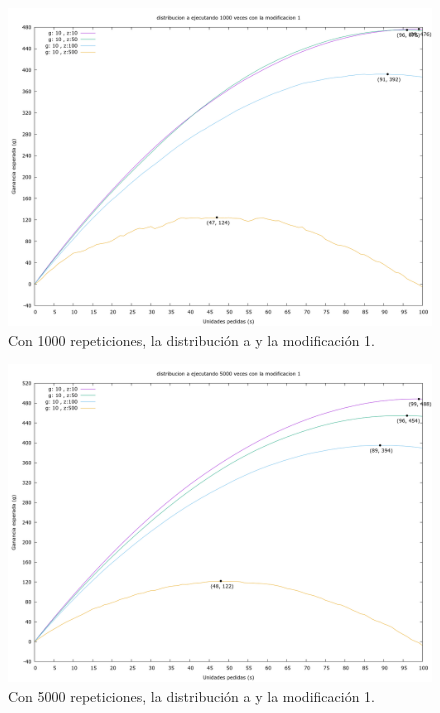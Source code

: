 \documentclass[12pt, spanish]{article}
\begin{document}
\begin{figure}[H]
	\centering
	\includegraphics[scale = 0.2]{prob_a/datos_a_1000_1.png}
	\caption{Con 1000 repeticiones, la distribución a y la modificación 1.}
	\label{fig:ej1_a_1000}

\end{figure}

\begin{figure}[H]
	\centering
	\includegraphics[scale = 0.2]{prob_a/datos_a_5000_1.png}
	\caption{Con 5000 repeticiones, la distribución a y la modificación 1.}
	\label{fig:ej1_a_5000}

\end{figure}
\end{document}
